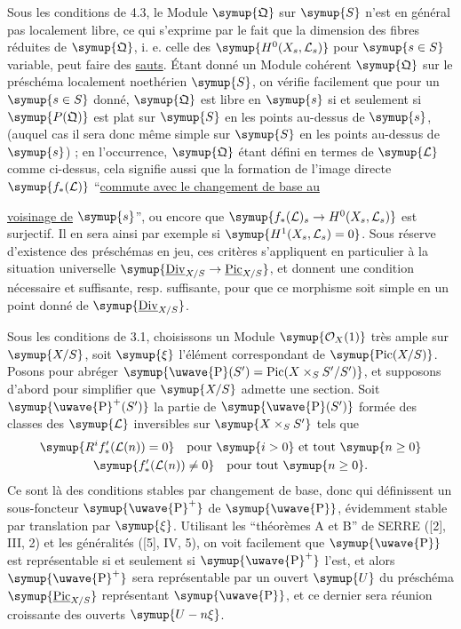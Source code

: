  Sous les conditions de 4.3, le Module $\symup{\mathfrak Q}$ sur
$\symup{S}$ n'est en général pas localement libre, ce qui s'exprime par le fait que la
dimension des fibres réduites de $\symup{\mathfrak Q}$, i. e. celle des
$\symup{H^0(X_s,\mathcal L_s)}$ pour $\symup{s\in S}$ variable, peut faire des \uline{sauts}. Étant
donné un Module cohérent $\symup{\mathfrak Q}$ sur le préschéma localement noethérien
$\symup{S}$, on vérifie facilement que pour un $\symup{s\in S}$ donné, $\symup{\mathfrak Q}$ est libre
en $\symup{s}$ si et seulement si $\symup{P(\mathfrak Q)}$ est plat sur $\symup{S}$ en les
points au-dessus de $\symup{s}$, (auquel cas il sera donc même simple sur $\symup{S}$ en les
points au-dessus de $\symup{s}$) ; en l'occurrence, $\symup{\mathfrak Q}$ étant défini en termes
de $\symup{\mathcal L}$ comme ci-dessus, cela signifie aussi que la formation de
l'image directe $\symup{f_*(\mathcal L)}$ ``\uline{commute avec le changement de base au}

\uline{voisinage de} $\symup{s}$'', ou encore que
$\symup{f_*(\mathcal L)_s\to H^0(X_s,\mathcal L_s)}$ est surjectif. Il en
sera ainsi par exemple si $\symup{H^1(X_s,\mathcal L_s)=0}$. Sous réserve d'existence
des préschémas en jeu, ces critères s'appliquent en particulier à la situation
universelle $\symup{\underline{\operatorname{Div}}_{X/S}\to\underline{\operatorname{Pic}}_{X/S}}$,
et donnent une condition nécessaire et suffisante, resp. suffisante, pour que
ce morphisme soit simple en un point donné de $\symup{\underline{\operatorname{Div}}_{X/S}}$.


Sous les conditions de 3.1, choisissons un Module $\symup{\mathcal O_X(1)}$ très ample
sur $\symup{X/S}$, soit $\symup{\xi}$ l'élément correspondant de
$\symup{\operatorname{Pic}(X/S)}$. Posons pour abréger
$\symup{\text{\uwave{P}}(S')=\operatorname{Pic}(X\times_SS'/S')}$, et supposons d'abord pour simplifier que $\symup{X/S}$ admette une section. Soit
$\symup{\text{\uwave{P}}^+(S')}$ la partie de $\symup{\text{\uwave{P}}(S')}$ formée des classes des $\symup{\mathcal L}$ inversibles
sur $\symup{X\times_SS'}$ tels que
\[
\begin{gathered}
\symup{R^if'_*(\mathcal L(n))=0}\quad\text{pour $\symup{i>0}$ et tout $\symup{n\geq0}$}\\
\symup{f'_*(\mathcal L(n))\neq0}\quad\text{pour tout $\symup{n\geq0}$}.
\end{gathered}
\]
Ce sont là des conditions stables par changement de base, donc qui définissent
un sous-foncteur $\symup{\text{\uwave{P}}^+}$ de $\symup{\text{\uwave{P}}}$, évidemment stable par translation par $\symup{\xi}$.
Utilisant les ``théorèmes A et B'' de SERRE ([2], III, 2) et les généralités
([5], IV, 5), on voit facilement que $\symup{\text{\uwave{P}}}$ est représentable si et seulement si
$\symup{\text{\uwave{P}}^+}$ l'est, et alors $\symup{\text{\uwave{P}}^+}$ sera représentable par un ouvert $\symup{U}$ du préschéma
$\symup{\underline{\operatorname{Pic}}_{X/S}}$ représentant $\symup{\text{\uwave{P}}}$, et ce dernier sera réunion
croissante des ouverts $\symup{U-n\xi}$.

